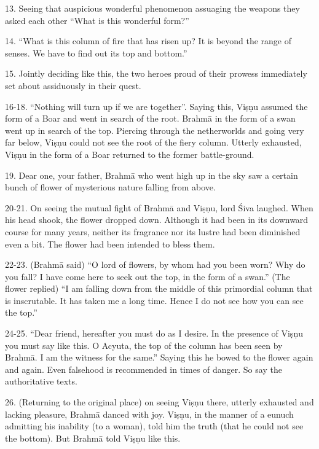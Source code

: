 13. Seeing that auspicious wonderful phenomenon assuaging the weapons they asked
each other “What is this wonderful form?”

14. “What is this column of fire that has risen up? It is beyond the range of
senses. We have to find out its top and bottom.”

15. Jointly deciding like this, the two heroes proud of their prowess
immediately set about assiduously in their quest.

16-18. “Nothing will turn up if we are together”. Saying this, Viṣṇu assumed
the form of a Boar and went in search of the root. Brahmā in the form of a swan
went up in search of the top. Piercing through the netherworlds and going very
far below, Viṣṇu could not see the root of the fiery column. Utterly exhausted,
Viṣṇu in the form of a Boar returned to the former battle-ground.

19. Dear one, your father, Brahmā who went high up in the sky saw a certain
bunch of  flower of mysterious nature falling from above.

20-21. On seeing the mutual fight of Brahmā and Viṣṇu, lord Śiva laughed. When
his head shook, the  flower dropped down. Although it had been in its
downward course for many years, neither its fragrance nor its lustre had been
diminished even a bit. The flower had been intended to bless them.

22-23. (Brahmā said) “O lord of flowers, by whom had you been worn? Why do you
fall? I have come here to seek out the top, in the form of a swan.” (The flower
replied) “I am falling down from the middle of this primordial column that is
inscrutable. It has taken me a long time. Hence I do not see how you can see
the top.”

24-25. “Dear friend, hereafter you must do as I desire. In the presence of Viṣṇu
you must say like this. O Acyuta, the top of the column has been seen by Brahmā.
I am the witness for the same.” Saying this he bowed to the  flower
again and again. Even falsehood is recommended in times of danger. So say
the authoritative texts.

26. (Returning to the original place) on seeing Viṣṇu there, utterly exhausted
and lacking pleasure, Brahmā danced with joy. Viṣṇu, in the manner of a eunuch
admitting his inability (to a woman), told him the truth (that he could not see
the bottom). But Brahmā told Viṣṇu like this.

